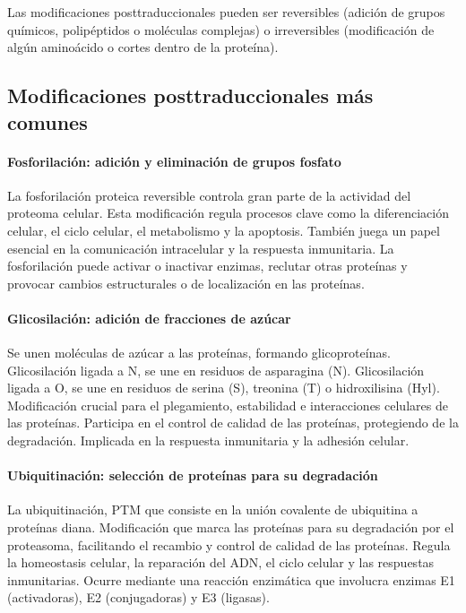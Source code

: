 Las modificaciones posttraduccionales pueden ser reversibles (adición de grupos químicos, polipéptidos o moléculas complejas) o irreversibles (modificación de algún aminoácido o cortes dentro de la proteína).

\subsection{Modificaciones posttraduccionales más comunes}
\paragraph{Fosforilación: adición y eliminación de grupos fosfato}
La fosforilación proteica reversible controla gran parte de la actividad del proteoma celular. Esta modificación regula procesos clave como la diferenciación celular, el ciclo celular, el metabolismo y la apoptosis. También juega un papel esencial en la comunicación intracelular y la respuesta inmunitaria. La fosforilación puede activar o inactivar enzimas, reclutar otras proteínas y provocar cambios estructurales o de localización en las proteínas.

\paragraph{Glicosilación: adición de fracciones de azúcar}
Se unen moléculas de azúcar a las proteínas, formando glicoproteínas. Glicosilación ligada a N, se une en residuos de asparagina (N). Glicosilación ligada a O, se une en residuos de serina (S), treonina (T) o hidroxilisina (Hyl). Modificación crucial para el plegamiento, estabilidad e interacciones celulares de las proteínas. Participa en el control de calidad de las proteínas, protegiendo de la degradación. Implicada en la respuesta inmunitaria y la adhesión celular.

\paragraph{Ubiquitinación: selección de proteínas para su degradación}
La ubiquitinación, PTM que consiste en la unión covalente de ubiquitina a proteínas diana. Modificación que marca las proteínas para su degradación por el proteasoma, facilitando el recambio y control de calidad de las proteínas. Regula la homeostasis celular, la reparación del ADN, el ciclo celular y las respuestas inmunitarias. Ocurre mediante una reacción enzimática que involucra enzimas E1 (activadoras), E2 (conjugadoras) y E3 (ligasas).

